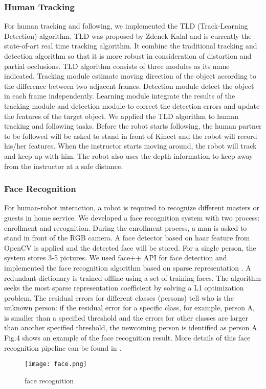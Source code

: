 \subsubsection{Human Tracking}
For human tracking and following, we implemented the TLD (Track-Learning Detection) algorithm\cite{kalal2012tracking}. TLD was proposed by Zdenek Kalal and is currently the state-of-art real time tracking algorithm. It combine the traditional tracking and detection algorithm so that it is more robust in consideration of distortion and partial occlusions. TLD algorithm consists of three modules as its name indicated. Tracking module estimate moving direction of the object according to the difference between two adjacent frames. Detection module detect the object in each frame independently. Learning module integrate the results of the tracking module and detection module to correct the detection errors and update the features of the target object.
We applied the TLD algorithm to human tracking and following tasks. Before the robot starts following, the human partner to be followed will be asked to stand in front of Kinect and the robot will record his/her features. When the instructor starts moving around, the robot will track and keep up with him. The robot also uses the depth information to keep away from the instructor at a safe distance.
\subsubsection{Face Recognition}
For human-robot interaction, a robot is required to recognize different masters or guests in home service. We developed a face recognition system with two process: enrollment and recognition. During the enrollment process, a man is asked to stand in front of the RGB camera. A face detector based on haar feature from OpenCV is applied and the detected face will be stored. For a single person, the system stores 3-5 pictures.
We used face++ API for face detection and implemented the face recognition algorithm based on sparse representation \cite{wright2009robust}. A redundant dictionary is trained offline using a set of training faces. The algorithm seeks the most sparse representation coefficient by solving a L1 optimization problem. The residual errors for different classes (persons) tell who is the unknown person: if the residual error for a specific class, for example, person A, is smaller than a specified threshold and the errors for other classes are larger than another specified threshold, the newcoming person is identified as person A. Fig.4 shows an example of the face recognition result. More details of this face recognition pipeline can be found in \cite{xia2015human}.
\begin{figure}[H]
	\centering
    \texttt{[image: face.png]}
    \caption{face recognition}
\end{figure}
